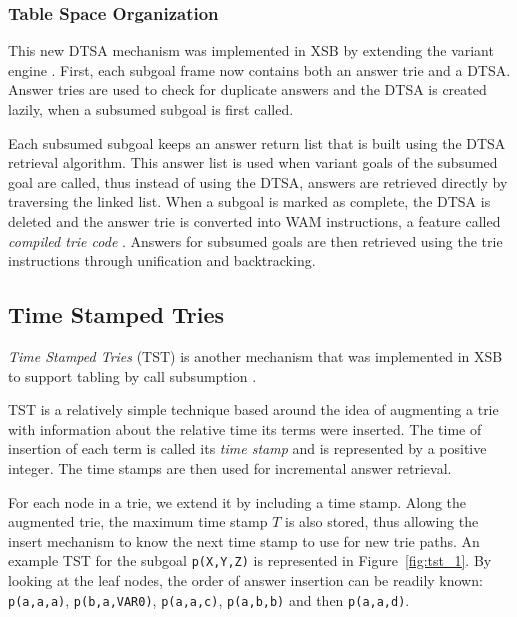 \subsubsection{Table Space Organization}

This new DTSA mechanism was implemented in XSB by extending the variant engine \cite{Rao-96}.
First, each subgoal frame now contains both an answer trie and a DTSA.
Answer tries are used to check for duplicate answers and the DTSA is created lazily, when a
subsumed subgoal is first called.

Each subsumed subgoal keeps an answer return list that is built using the DTSA retrieval algorithm.
This answer list is used when variant goals of the subsumed goal are called, thus instead of using
the DTSA, answers are retrieved directly by traversing the linked list.
When a subgoal is marked as complete, the DTSA is deleted and the answer trie is converted into WAM
instructions, a feature called \textit{compiled trie code} \cite{RamakrishnanIV-99}. Answers for
subsumed goals are then retrieved using the trie instructions through unification and backtracking.

\subsection{Time Stamped Tries} \label{sec:time_stamped_tries}

\textit{Time Stamped Tries} (TST) is another mechanism that was implemented in XSB
to support tabling by call subsumption \cite{Johnson-99}.

TST is a relatively simple technique based around the idea of augmenting a trie with information about the relative time
its terms were inserted. The time of insertion of each term is called its \textit{time stamp} and is represented by a
positive integer. The time stamps are then used for incremental answer retrieval.

For each node in a trie, we extend it by including a time stamp. Along the augmented trie, the maximum time stamp
$T$ is also stored, thus allowing the insert mechanism to know the next time stamp to use for new trie paths.
An example TST for the subgoal \texttt{p(X,Y,Z)} is represented in Figure~\ref{fig:tst_1}.
By looking at the leaf nodes, the order of answer insertion
can be readily known: \texttt{p(a,a,a)}, \texttt{p(b,a,VAR0)}, \texttt{p(a,a,c)}, \texttt{p(a,b,b)} and then
\texttt{p(a,a,d)}.

